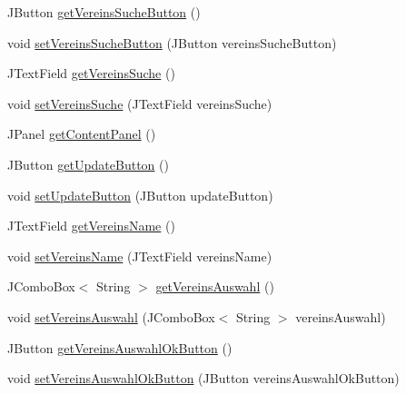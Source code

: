 \begin{DoxyCompactItemize}
J\+Button \hyperlink{classde_1_1turnierverwaltung_1_1view_1_1_d_s_b_d_w_z_dialog_view_af05d8d7718a4091eb78f8ec794bf2ae7}{get\+Vereins\+Suche\+Button} ()
\item 
void \hyperlink{classde_1_1turnierverwaltung_1_1view_1_1_d_s_b_d_w_z_dialog_view_a85a8a6533c17087a8fab0ea0a34270fb}{set\+Vereins\+Suche\+Button} (J\+Button vereins\+Suche\+Button)
\item 
J\+Text\+Field \hyperlink{classde_1_1turnierverwaltung_1_1view_1_1_d_s_b_d_w_z_dialog_view_aa7a6103287e5ebc26b778de633ff4916}{get\+Vereins\+Suche} ()
\item 
void \hyperlink{classde_1_1turnierverwaltung_1_1view_1_1_d_s_b_d_w_z_dialog_view_a49c70ccc213d725ad2b38f641d81e3ac}{set\+Vereins\+Suche} (J\+Text\+Field vereins\+Suche)
\item 
J\+Panel \hyperlink{classde_1_1turnierverwaltung_1_1view_1_1_d_s_b_d_w_z_dialog_view_a15c356115f522cda3245b007fe96c2c5}{get\+Content\+Panel} ()
\item 
J\+Button \hyperlink{classde_1_1turnierverwaltung_1_1view_1_1_d_s_b_d_w_z_dialog_view_a530da8b4077283e7a46756c4babe0d81}{get\+Update\+Button} ()
\item 
void \hyperlink{classde_1_1turnierverwaltung_1_1view_1_1_d_s_b_d_w_z_dialog_view_a52a327eed2d7cbfa552204c9db11285a}{set\+Update\+Button} (J\+Button update\+Button)
\item 
J\+Text\+Field \hyperlink{classde_1_1turnierverwaltung_1_1view_1_1_d_s_b_d_w_z_dialog_view_abad917c4debdfc8aa11fede8bc4ea126}{get\+Vereins\+Name} ()
\item 
void \hyperlink{classde_1_1turnierverwaltung_1_1view_1_1_d_s_b_d_w_z_dialog_view_ab2ab99e02d1e374147bdf9db026e1bbe}{set\+Vereins\+Name} (J\+Text\+Field vereins\+Name)
\item 
J\+Combo\+Box$<$ String $>$ \hyperlink{classde_1_1turnierverwaltung_1_1view_1_1_d_s_b_d_w_z_dialog_view_a868916501418d4eb27d8c41787e226f5}{get\+Vereins\+Auswahl} ()
\item 
void \hyperlink{classde_1_1turnierverwaltung_1_1view_1_1_d_s_b_d_w_z_dialog_view_a261d3e50bd00f8a7201283a832250017}{set\+Vereins\+Auswahl} (J\+Combo\+Box$<$ String $>$ vereins\+Auswahl)
\item 
J\+Button \hyperlink{classde_1_1turnierverwaltung_1_1view_1_1_d_s_b_d_w_z_dialog_view_a2e65e56ac28a757288ba5f7c5b9e3fff}{get\+Vereins\+Auswahl\+Ok\+Button} ()
\item 
void \hyperlink{classde_1_1turnierverwaltung_1_1view_1_1_d_s_b_d_w_z_dialog_view_a0a37811ef34db7ac2599cfed7025dc6e}{set\+Vereins\+Auswahl\+Ok\+Button} (J\+Button vereins\+Auswahl\+Ok\+Button)
\end{DoxyCompactItemize}


